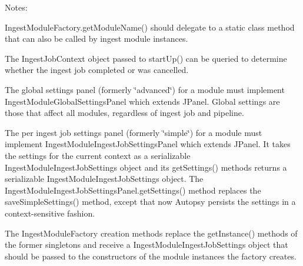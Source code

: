 Notes\+:
\begin{DoxyItemize}
\item Ingest\+Module\+Factory.\+get\+Module\+Name() should delegate to a static class method that can also be called by ingest module instances.
\item The Ingest\+Job\+Context object passed to start\+Up() can be queried to determine whether the ingest job completed or was cancelled.
\item The global settings panel (formerly \char`\"{}advanced\char`\"{}) for a module must implement Ingest\+Module\+Global\+Settings\+Panel which extends J\+Panel. Global settings are those that affect all modules, regardless of ingest job and pipeline.
\item The per ingest job settings panel (formerly \char`\"{}simple\char`\"{}) for a module must implement Ingest\+Module\+Ingest\+Job\+Settings\+Panel which extends J\+Panel. It takes the settings for the current context as a serializable Ingest\+Module\+Ingest\+Job\+Settings object and its get\+Settings() methods returns a serializable Ingest\+Module\+Ingest\+Job\+Settings object. The Ingest\+Module\+Ingest\+Job\+Settings\+Panel.\+get\+Settings() method replaces the save\+Simple\+Settings() method, except that now Autopsy persists the settings in a context-\/sensitive fashion.
\item The Ingest\+Module\+Factory creation methods replace the get\+Instance() methods of the former singletons and receive a Ingest\+Module\+Ingest\+Job\+Settings object that should be passed to the constructors of the module instances the factory creates. 
\end{DoxyItemize}